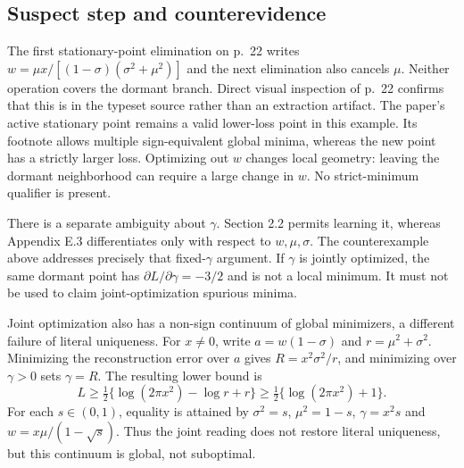 \documentclass[10pt]{article}
\begin{document}
\subsection*{Suspect step and counterevidence}
The first stationary-point elimination on p. 22 writes \(w=\mu x/[(1-\sigma)(\sigma^2+\mu^2)]\) and the next elimination also cancels \(\mu\). Neither operation covers the dormant branch. Direct visual inspection of p. 22 confirms that this is in the typeset source rather than an extraction artifact. The paper’s active stationary point remains a valid lower-loss point in this example. Its footnote allows multiple sign-equivalent global minima, whereas the new point has a strictly larger loss. Optimizing out \(w\) changes local geometry: leaving the dormant neighborhood can require a large change in \(w\). No strict-minimum qualifier is present.\par
There is a separate ambiguity about \(\gamma\). Section 2.2 permits learning it, whereas Appendix E.3 differentiates only with respect to \(w,\mu,\sigma\). The counterexample above addresses precisely that fixed-\(\gamma\) argument. If \(\gamma\) is jointly optimized, the same dormant point has \(\partial L/\partial\gamma=-3/2\) and is not a local minimum. It must not be used to claim joint-optimization spurious minima.\par
Joint optimization also has a non-sign continuum of global minimizers, a different failure of literal uniqueness. For \(x\ne0\), write \(a=w(1-\sigma)\) and \(r=\mu^2+\sigma^2\). Minimizing the reconstruction error over \(a\) gives \(R=x^2\sigma^2/r\), and minimizing over \(\gamma>0\) sets \(\gamma=R\). The resulting lower bound is \[L\geq \tfrac12\{\log(2\pi x^2)-\log r+r\}
 \geq \tfrac12\{\log(2\pi x^2)+1\}.\] For each \(s\in(0,1)\), equality is attained by \(\sigma^2=s\), \(\mu^2=1-s\), \(\gamma=x^2s\) and \(w=x\mu/(1-\sqrt{s})\). Thus the joint reading does not restore literal uniqueness, but this continuum is global, not suboptimal.\par
\end{document}
